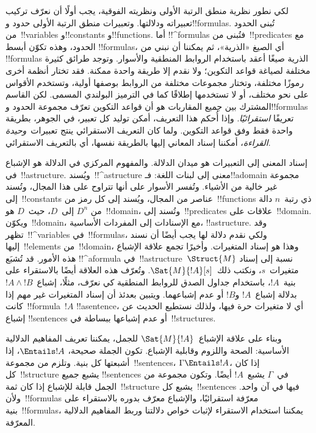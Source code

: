\documentclass[../../../include/open-logic-section]{subfiles}
\begin{document}


لكي نطور نظرية منطق الرتبة الأولى ونظريته الفوقية، يجب أولًا أن نعرّف
تركيب تعبيراته ودلالتها. وتعبيرات منطق الرتبة الأولى حدود و!!{formula}s.
تُبنى الحدود من~!!{variable}s و!!{constant}s و!!{function}s. أما
!!^{formula}s فتُبنى من~!!{predicate}s مع الحدود، وهذه تكوّن أبسط
!!{formula}s، أي الصيغ «الذرية»، ثم يمكننا أن نبني من
!!{formula}s الذرية صيغًا أعقد باستخدام الروابط المنطقية والأسوار.
وتوجد طرائق كثيرة مختلفة لصياغة قواعد التكوين؛ ولا نقدم إلا طريقة
واحدة ممكنة. فقد تختار أنظمة أخرى رموزًا مختلفة، وتختار مجموعات مختلفة
من الروابط بوصفها أولية، وتستخدم الأقواس على نحو مختلف، أو لا تستخدمها
إطلاقًا كما في الترميز البولندي المسمى. لكن القاسم المشترك بين جميع
المقاربات هو أن قواعد التكوين تعرّف مجموعة الحدود و!!{formula}s
تعريفًا 
\emph{استقرائيًا}. وإذا أُحكم هذا التعريف، أمكن توليد كل تعبير، في
الجوهر، بطريقة واحدة فقط وفق قواعد التكوين. ولما كان التعريف
الاستقرائي ينتج تعبيرات~\emph{وحيدة القراءة}، أمكننا إسناد المعاني
إليها بالطريقة نفسها، أي بالتعريف الاستقرائي.

إسناد المعنى إلى التعبيرات هو ميدان الدلالة. والمفهوم المركزي في
الدلالة هو الإشباع في~!!a{structure}. ويُسند~!!^a{structure} معنى إلى
لبنات اللغة: فـ!!a{domain} مجموعة غير خالية من الأشياء. وتُفسر الأسوار
على أنها تتراوح على هذا المجال، وتُسند إلى~!!{constant}s عناصر من
المجال، ويُسند إلى كل رمز من~!!{function}s ذي رتبة~$n$ دالة من
$D^n$ إلى~$D$، حيث~$D$ هو~!!{domain}، وتُسند إلى~!!{predicate}s علاقات
على~!!{domain}. ويكوّن~!!{domain}، مع الإسنادات إلى المفردات الأساسية،
!!a{structure}. وقد تظهر~!!^{variable}s في~!!{formula}s، ولكي نقدم
دلالة لها يجب أيضًا أن نسند إليها~!!{element}s من~!!{domain}، وهذا هو
إسناد المتغيرات. وأخيرًا تجمع علاقة الإشباع هذه الأمور. قد تُشبَع
!!^a{formula} في~!!a{structure}~$\Struct{M}$ نسبة إلى إسناد متغيرات~$s$،
ونكتب ذلك~$\Sat{M}{!A}[s]$. وتُعرّف هذه العلاقة أيضًا بالاستقراء على
بنية~$!A$، باستخدام جداول الصدق للروابط المنطقية كي نعرّف، مثلًا،
إشباع~$!A \land !B$ بدلالة إشباع~$!A$ و$!B$ أو عدم إشباعهما. ويتبين
بعدئذ أن إسناد المتغيرات غير مهم إذا كانت~!!{formula}~$!A$
!!a{sentence}، أي لا متغيرات حرة فيها، ولذلك نستطيع الحديث عن إشباع
!!{sentence}s أو عدم إشباعها ببساطة في~!!{structure}s.

وبناء على علاقة الإشباع~$\Sat{M}{!A}$ للجمل، يمكننا تعريف المفاهيم
الدلالية الأساسية: الصحة واللزوم وقابلية الإشباع. تكون الجملة صحيحة،
$\Entails !A$، إذا أشبعتها كل بنية. وتلزم من مجموعة~!!{sentence}s،
$\Gamma \Entails !A$، إذا كان كل~!!{structure} يشبع جميع
!!{sentence}s في~$\Gamma$ يشبع~$!A$ أيضًا. وتكون مجموعة من الجمل قابلة
للإشباع إذا كان ثمة~!!{structure} يشبع كل~!!{sentence}s فيها في آن
واحد. ولأن~!!{formula}s معرّفة استقرائيًا، والإشباع معرّف بدوره
بالاستقراء على بنية~!!{formula}s، يمكننا استخدام الاستقراء لإثبات خواص
دلالتنا وربط المفاهيم الدلالية المعرّفة.
\end{document}
